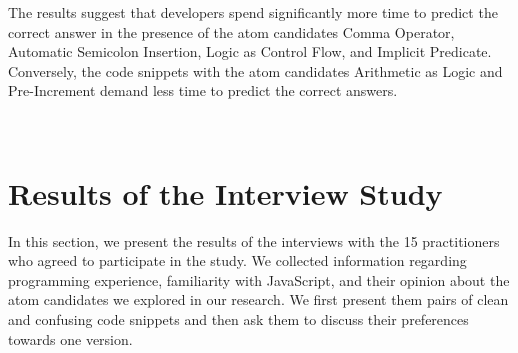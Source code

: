 \begin{mh}
  The results suggest that developers spend
  significantly more time to predict the
  correct answer in the presence of the
  atom candidates Comma Operator, Automatic Semicolon Insertion, Logic as
  Control Flow, and Implicit Predicate. Conversely,
  the code snippets with the
  atom candidates Arithmetic as Logic and
  Pre-Increment demand less time to
  predict the correct answers. 
\end{mh}




\


\section{Results of the Interview Study}
\label{sec:interview-results}


In this section, we present the results of the 
interviews with the 15 practitioners who agreed to participate
in the study. 
We collected information regarding programming
experience, familiarity with JavaScript, and their opinion
about the \na atom candidates we explored in our research.
We first present them pairs of clean and confusing code snippets 
and then ask them to discuss their preferences towards one version.



